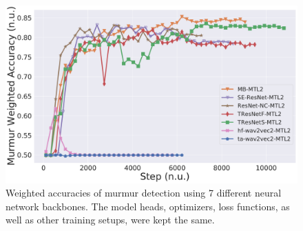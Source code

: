 
\begin{figure}[!htp]
\centering
\includegraphics[width=\linewidth]{images/compare_nn.pdf}
\caption{Weighted accuracies of murmur detection using 7 different neural network backbones. The model heads, optimizers, loss functions, as well as other training setups, were kept the same.}
\label{fig:compare_nn}
\end{figure}

